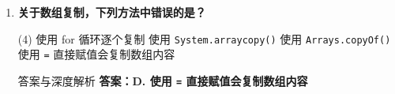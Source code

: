 \documentclass[12pt, a4paper]{ctexart}
\newcommand{\code}[1]{\texttt{#1}}
\begin{document}
\begin{enumerate}[label=\textbf{\arabic*.}, leftmargin=*, itemsep=1.5em]
\begin{bluebox}{答案与深度解析}
\begin{itemize}[leftmargin=*, nosep]
			      \item \textbf{D. boolean 类型可以转换为 int 类型 — 错误}
			            \begin{itemize}[leftmargin=*, nosep]
				            \item \textbf{JLS 规范}：boolean 类型独立，不参与数值转换（JLS §4.2）
				            \item \textbf{设计哲学}：防止 C 语言风格的真假混淆（0/1）
				            \item \textbf{编译错误}：任何 boolean 与 numeric 类型的转换均报错
			            \end{itemize}
		      \end{itemize}

		      \textbf{【应背诵知识点（命题人思维版）】}
		      \begin{enumerate}[leftmargin=*, nosep]
			      \item \textbf{自动转换表}：byte→short→int→long→float→double；char→int→long...
			      \item \textbf{精度损失特例}：int→float, long→float, long→double 可能丢失低位精度
			      \item \textbf{boolean 隔离}：boolean 与其他类型互不相通
		      \end{enumerate}

		      \textbf{【命题趋势与实战策略】}
		      \begin{itemize}[leftmargin=*, nosep]
			      \item \textbf{高频陷阱}：认为 widening conversion 永远不会丢失信息（错，float 精度有限）
			      \item \textbf{考场秒杀}：见 float/double 转换想精度，见 boolean 想隔离
		      \end{itemize}
	      \end{bluebox}

	\item \textbf{关于数组复制，下列方法中错误的是？}
	      \begin{tasks}(4)
		      \task 使用 for 循环逐个复制
		      \task 使用 \code{System.arraycopy()}
		      \task 使用 \code{Arrays.copyOf()}
		      \task 使用 \code{=} 直接赋值会复制数组内容
	      \end{tasks}
	      \begin{bluebox}{答案与深度解析}
		      \textbf{答案：D. 使用 \code{=} 直接赋值会复制数组内容}


\end{bluebox}
\end{enumerate}
\end{document}
